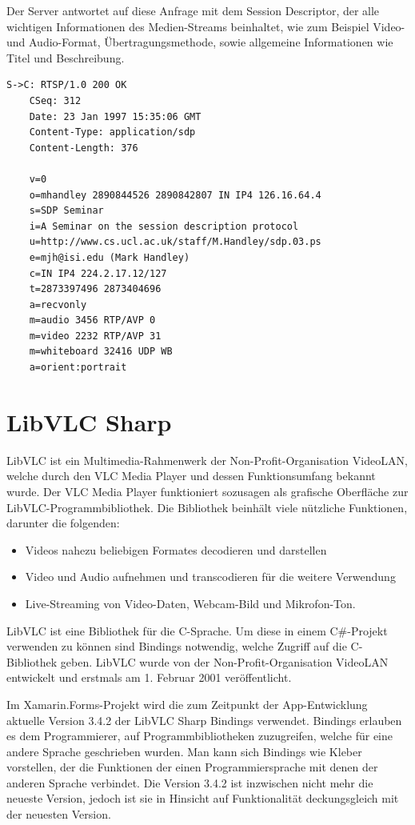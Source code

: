 Der Server antwortet auf diese Anfrage mit dem Session Descriptor, der alle wichtigen Informationen des Medien-Streams beinhaltet, wie zum Beispiel Video- und Audio-Format, Übertragungsmethode, sowie allgemeine Informationen wie Titel und Beschreibung.
\begin{verbatim}
S->C: RTSP/1.0 200 OK
    CSeq: 312
    Date: 23 Jan 1997 15:35:06 GMT
    Content-Type: application/sdp
    Content-Length: 376

    v=0
    o=mhandley 2890844526 2890842807 IN IP4 126.16.64.4
    s=SDP Seminar
    i=A Seminar on the session description protocol
    u=http://www.cs.ucl.ac.uk/staff/M.Handley/sdp.03.ps
    e=mjh@isi.edu (Mark Handley)
    c=IN IP4 224.2.17.12/127
    t=2873397496 2873404696
    a=recvonly
    m=audio 3456 RTP/AVP 0
    m=video 2232 RTP/AVP 31
    m=whiteboard 32416 UDP WB
    a=orient:portrait
\end{verbatim}

\section{LibVLC Sharp}
LibVLC ist ein Multimedia-Rahmenwerk der Non-Profit-Organisation VideoLAN, welche durch den VLC Media Player und dessen Funktionsumfang bekannt wurde. Der VLC Media Player funktioniert sozusagen als grafische Oberfläche zur LibVLC-Programmbibliothek.
Die Bibliothek beinhält viele nützliche Funktionen, darunter die folgenden:
\begin{itemize}
    \item Videos nahezu beliebigen Formates decodieren und darstellen
    \item Video und Audio aufnehmen und transcodieren für die weitere Verwendung
    \item Live-Streaming von Video-Daten, Webcam-Bild und Mikrofon-Ton.
\end{itemize}    
LibVLC ist eine Bibliothek für die C-Sprache. Um diese in einem C\#-Projekt verwenden zu können sind Bindings notwendig, welche Zugriff auf die C-Bibliothek geben.
LibVLC wurde von der Non-Profit-Organisation VideoLAN entwickelt und erstmals am 1. Februar 2001 veröffentlicht. \cite[vgl.][]{libvlc-release}\par

Im Xamarin.Forms-Projekt wird die zum Zeitpunkt der App-Entwicklung aktuelle Version 3.4.2 der LibVLC Sharp Bindings verwendet. Bindings erlauben es dem Programmierer, auf Programmbibliotheken zuzugreifen, welche für eine andere Sprache geschrieben wurden. Man kann sich Bindings wie Kleber vorstellen, der die Funktionen der einen Programmiersprache mit denen der anderen Sprache verbindet. Die Version 3.4.2 ist inzwischen nicht mehr die neueste Version, jedoch ist sie in Hinsicht auf Funktionalität deckungsgleich mit der neuesten Version.\par

